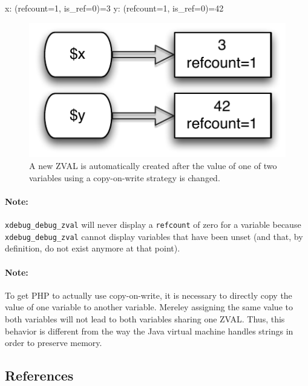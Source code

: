 \begin{textcode}
x: (refcount=1, is_ref=0)=3
y: (refcount=1, is_ref=0)=42
\end{textcode}

\begin{figure}[htb]
  \begin{center}
    \includegraphics[scale=0.8]{images/x_3_y_42}
    \caption{A new ZVAL is automatically created after the value of one of two variables using a copy-on-write strategy is changed.}
    \label{fig:new-zval-after-copy-on-write}
  \end{center}
\end{figure}

\paragraph{Note:} \texttt{xdebug\_debug\_zval} will never display a \texttt{refcount} of zero for a variable because \texttt{xdebug\_debug\_zval} cannot display variables that have been unset (and that, by definition, do not exist anymore at that point).

\paragraph{Note:} To get PHP to actually use copy-on-write, it is necessary to directly copy the value of one variable to another variable. Mereley assigning the same value to both variables will not lead to both variables sharing one ZVAL. Thus, this behavior is different from the way the Java virtual machine handles strings in order to preserve memory.~\cite[chapter~2]{jvm-spec}


\subsection{References}
\label{sec:references}

